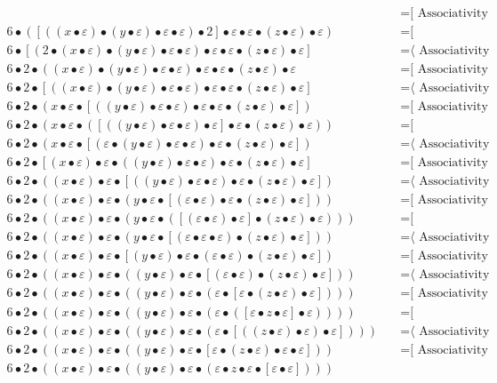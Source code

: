 \documentclass{article}
\begin{document}
\begin{align*}
  & \quad \text{=[ Associativity ⟩}\\
6 • ([((x • ε) • (y • ε) • ε • ε) • 2] • ε • ε • (z • ε) • ε)
  & \quad \text{=[ Commutativity ⟩}\\
6 • [(2 • (x • ε) • (y • ε) • ε • ε) • ε • ε • (z • ε) • ε]
  & \quad \text{=⟨ Associativity ]}\\
6 • 2 • ((x • ε) • (y • ε) • ε • ε) • ε • ε • (z • ε) • ε
  & \quad \text{=[ Associativity ⟩}\\
6 • 2 • [((x • ε) • (y • ε) • ε • ε) • ε • ε • (z • ε) • ε]
  & \quad \text{=⟨ Associativity ]}\\
6 • 2 • (x • ε • [((y • ε) • ε • ε) • ε • ε • (z • ε) • ε])
  & \quad \text{=[ Associativity ⟩}\\
6 • 2 • (x • ε • ([((y • ε) • ε • ε) • ε] • ε • (z • ε) • ε))
  & \quad \text{=[ Commutativity ⟩}\\
6 • 2 • (x • ε • [(ε • (y • ε) • ε • ε) • ε • (z • ε) • ε])
  & \quad \text{=⟨ Associativity ]}\\
6 • 2 • [(x • ε) • ε • ((y • ε) • ε • ε) • ε • (z • ε) • ε]
  & \quad \text{=[ Associativity ⟩}\\
6 • 2 • ((x • ε) • ε • [((y • ε) • ε • ε) • ε • (z • ε) • ε])
  & \quad \text{=⟨ Associativity ]}\\
6 • 2 • ((x • ε) • ε • (y • ε • [(ε • ε) • ε • (z • ε) • ε]))
  & \quad \text{=[ Associativity ⟩}\\
6 • 2 • ((x • ε) • ε • (y • ε • ([(ε • ε) • ε] • (z • ε) • ε)))
  & \quad \text{=[ Commutativity ⟩}\\
6 • 2 • ((x • ε) • ε • (y • ε • [(ε • ε • ε) • (z • ε) • ε]))
  & \quad \text{=⟨ Associativity ]}\\
6 • 2 • ((x • ε) • ε • [(y • ε) • ε • (ε • ε) • (z • ε) • ε])
  & \quad \text{=[ Associativity ⟩}\\
6 • 2 • ((x • ε) • ε • ((y • ε) • ε • [(ε • ε) • (z • ε) • ε]))
  & \quad \text{=⟨ Associativity ]}\\
6 • 2 • ((x • ε) • ε • ((y • ε) • ε • (ε • [ε • (z • ε) • ε])))
  & \quad \text{=[ Associativity ⟩}\\
6 • 2 • ((x • ε) • ε • ((y • ε) • ε • (ε • ([ε • z • ε] • ε))))
  & \quad \text{=[ Commutativity ⟩}\\
6 • 2 • ((x • ε) • ε • ((y • ε) • ε • (ε • [((z • ε) • ε) • ε])))
  & \quad \text{=⟨ Associativity ]}\\
6 • 2 • ((x • ε) • ε • ((y • ε) • ε • [ε • (z • ε) • ε • ε]))
  & \quad \text{=[ Associativity ⟩}\\
6 • 2 • ((x • ε) • ε • ((y • ε) • ε • (ε • z • ε • [ε • ε])))

\end{align*}
\end{document}
